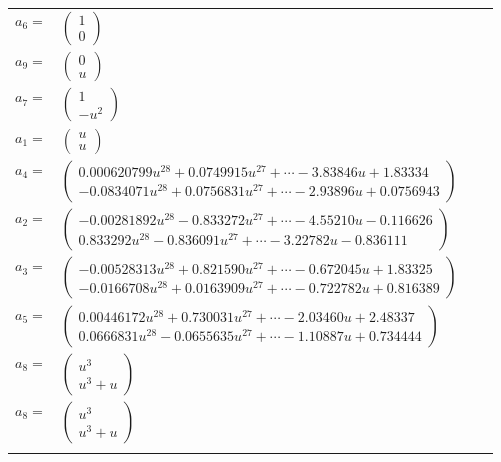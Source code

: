 \documentclass[1p]{elsarticle_modified}
\theoremstyle{definition}
\begin{document}
\begin{tabular}{m{7pt} m{180pt} m{7pt} m{180pt} }
\flushright $a_{6}=$&$\begin{pmatrix}1\\0\end{pmatrix}$ \\
\flushright $a_{9}=$&$\begin{pmatrix}0\\u\end{pmatrix}$ \\
\flushright $a_{7}=$&$\begin{pmatrix}1\\- u^2\end{pmatrix}$ \\
\flushright $a_{1}=$&$\begin{pmatrix}u\\u\end{pmatrix}$ \\
\flushright $a_{4}=$&$\begin{pmatrix}0.000620799 u^{28}+0.0749915 u^{27}+\cdots-3.83846 u+1.83334\\-0.0834071 u^{28}+0.0756831 u^{27}+\cdots-2.93896 u+0.0756943\end{pmatrix}$ \\
\flushright $a_{2}=$&$\begin{pmatrix}-0.00281892 u^{28}-0.833272 u^{27}+\cdots-4.55210 u-0.116626\\0.833292 u^{28}-0.836091 u^{27}+\cdots-3.22782 u-0.836111\end{pmatrix}$ \\
\flushright $a_{3}=$&$\begin{pmatrix}-0.00528313 u^{28}+0.821590 u^{27}+\cdots-0.672045 u+1.83325\\-0.0166708 u^{28}+0.0163909 u^{27}+\cdots-0.722782 u+0.816389\end{pmatrix}$ \\
\flushright $a_{5}=$&$\begin{pmatrix}0.00446172 u^{28}+0.730031 u^{27}+\cdots-2.03460 u+2.48337\\0.0666831 u^{28}-0.0655635 u^{27}+\cdots-1.10887 u+0.734444\end{pmatrix}$ \\
\flushright $a_{8}=$&$\begin{pmatrix}u^3\\u^3+u\end{pmatrix}$\\ \flushright $a_{8}=$&$\begin{pmatrix}u^3\\u^3+u\end{pmatrix}$\\&\end{tabular}
\end{document}
